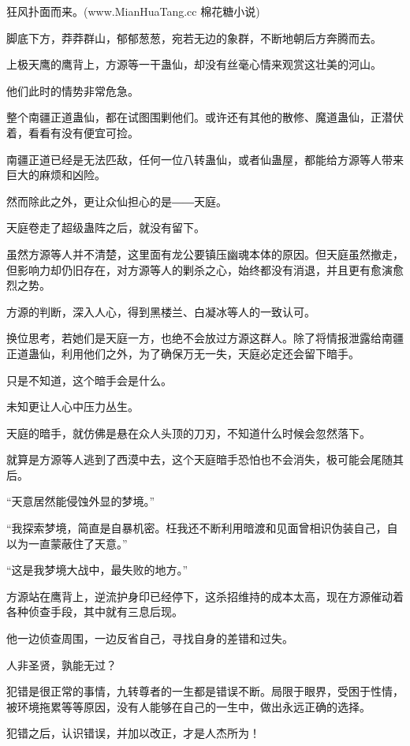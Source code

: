 
\begin{this_body}

狂风扑面而来。(www.MianHuaTang.cc 棉花糖小说)

脚底下方，莽莽群山，郁郁葱葱，宛若无边的象群，不断地朝后方奔腾而去。

上极天鹰的鹰背上，方源等一干蛊仙，却没有丝毫心情来观赏这壮美的河山。

他们此时的情势非常危急。

整个南疆正道蛊仙，都在试图围剿他们。或许还有其他的散修、魔道蛊仙，正潜伏着，看看有没有便宜可捡。

南疆正道已经是无法匹敌，任何一位八转蛊仙，或者仙蛊屋，都能给方源等人带来巨大的麻烦和凶险。

然而除此之外，更让众仙担心的是――天庭。

天庭卷走了超级蛊阵之后，就没有留下。

虽然方源等人并不清楚，这里面有龙公要镇压幽魂本体的原因。但天庭虽然撤走，但影响力却仍旧存在，对方源等人的剿杀之心，始终都没有消退，并且更有愈演愈烈之势。

方源的判断，深入人心，得到黑楼兰、白凝冰等人的一致认可。

换位思考，若她们是天庭一方，也绝不会放过方源这群人。除了将情报泄露给南疆正道蛊仙，利用他们之外，为了确保万无一失，天庭必定还会留下暗手。

只是不知道，这个暗手会是什么。

未知更让人心中压力丛生。

天庭的暗手，就仿佛是悬在众人头顶的刀刃，不知道什么时候会忽然落下。

就算是方源等人逃到了西漠中去，这个天庭暗手恐怕也不会消失，极可能会尾随其后。

“天意居然能侵蚀外显的梦境。”

“我探索梦境，简直是自暴机密。枉我还不断利用暗渡和见面曾相识伪装自己，自以为一直蒙蔽住了天意。”

“这是我梦境大战中，最失败的地方。”

方源站在鹰背上，逆流护身印已经停下，这杀招维持的成本太高，现在方源催动着各种侦查手段，其中就有三息后现。

他一边侦查周围，一边反省自己，寻找自身的差错和过失。

人非圣贤，孰能无过？

犯错是很正常的事情，九转尊者的一生都是错误不断。局限于眼界，受困于性情，被环境拖累等等原因，没有人能够在自己的一生中，做出永远正确的选择。

犯错之后，认识错误，并加以改正，才是人杰所为！


\end{this_body}
